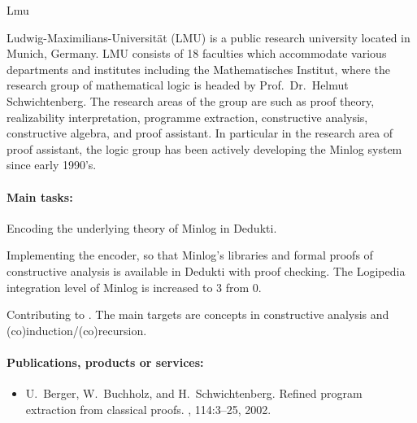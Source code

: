 \begin{sitedescription}{Lmu}

\newcommand{\inquotes}[1]{``#1''}


Ludwig-Maximilians-Universit\"at (LMU) is a public research university
located in Munich, Germany.  LMU consists of 18 faculties which
accommodate various departments and institutes including the
Mathematisches Institut, where the research group of mathematical
logic is headed by Prof.\ Dr.\ Helmut Schwichtenberg.  The research
areas of the group are such as proof theory, realizability
interpretation, programme extraction, constructive analysis,
constructive algebra, and proof assistant.  In particular in the
research area of proof assistant, the logic group has been actively
developing the Minlog system since early 1990's.

\paragraph{Main tasks:}

\begin{compactitem}
  \item Encoding the underlying theory of Minlog in Dedukti.  
  \item Implementing the encoder, so that Minlog's libraries and formal proofs of constructive analysis is available in Dedukti with proof checking.
The Logipedia integration level of Minlog is increased to 3 from 0.  
  \item Contributing to .  The main targets are concepts in constructive analysis and (co)induction/(co)recursion.

\end{compactitem}

\paragraph{Publications, products or services:}

\begin{itemize}
\item U.~Berger, W.~Buchholz, and H.~Schwichtenberg.
\newblock Refined program extraction from classical proofs.
, 114:3--25, 2002.


\end{itemize}
\end{sitedescription}
